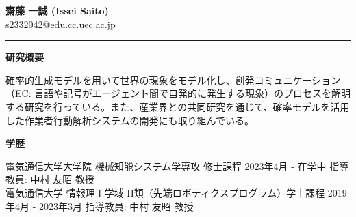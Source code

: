 \documentclass[a4paper,10pt]{article}
\begin{document}
\begin{center}
    \textbf{\LARGE 齋藤 一誠 (Issei Saito)} \\
    s2332042@edu.cc.uec.ac.jp
\end{center}

\noindent\rule{\textwidth}{1.5pt}

\noindent
\begin{minipage}[t]{0.3\textwidth}
    \textbf{研究概要}
\end{minipage}%
\begin{minipage}[t]{0.7\textwidth}
確率的生成モデルを用いて世界の現象をモデル化し、創発コミュニケーション（EC: 言語や記号がエージェント間で自発的に発生する現象）のプロセスを解明する研究を行っている。また、産業界との共同研究を通じて、確率モデルを活用した作業者行動解析システムの開発にも取り組んでいる。
\end{minipage}

\vspace{10pt}

\noindent
\begin{minipage}[t]{0.3\textwidth}
    \textbf{学歴}
\end{minipage}%
\begin{minipage}[t]{0.7\textwidth}
    電気通信大学大学院 機械知能システム学専攻 修士課程 \hfill 2023年4月 - 在学中 \newline
    指導教員: 中村 友昭 教授 \newline\\
    電気通信大学 情報理工学域 II類（先端ロボティクスプログラム）学士課程 \hfill 2019年4月 - 2023年3月 \newline
    指導教員: 中村 友昭 教授
\end{minipage}

\vspace{10pt}
\end{document}
